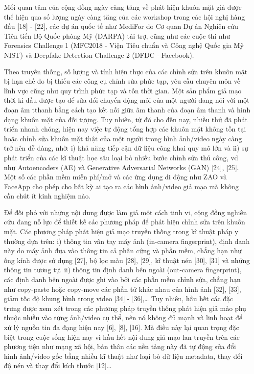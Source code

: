 \documentclass{article}
\begin{document}
Mối quan tâm của cộng đồng ngày càng tăng về phát hiện khuôn mặt giả được thể hiện qua số lượng ngày càng tăng của các workshop trong các hội nghị hàng đầu [18] - [22], các dự án quốc tế như MediFor do Cơ quan Dự án Nghiên cứu Tiên tiến Bộ Quốc phòng Mỹ (DARPA) tài trợ, cũng như các cuộc thi như Forensics Challenge 1 (MFC2018 - Viện Tiêu chuẩn và Công nghệ Quốc gia Mỹ NIST) và Deepfake Detection Challenge 2 (DFDC - Facebook).

Theo truyền thống, số lượng và tính hiện thực của các chỉnh sửa trên khuôn mặt bị hạn chế do bị thiếu các công cụ chỉnh sửa phức tạp, yêu cầu chuyên môn về lĩnh vực cũng như quy trình phức tạp và tốn thời gian. Một sản phẩm giả mạo thời kì đầu được tạo để sửa đổi chuyển động môi của một người đang nói với một đoạn âm tthanh bằng cách tạo kết nối giữa âm thanh của đoạn âm thanh và hình dạng khuôn mặt của đối tượng. Tuy nhiên, từ đó cho đến nay, nhiều thứ đã phát triển nhanh chóng, hiện nay việc tự động tổng hợp các khuôn mặt không tồn tại hoặc chỉnh sửa khuôn mặt thật của một người trong hình ảnh/video ngày càng trở nên dễ dàng, nhờ: i) khả năng tiếp cận dữ liệu công khai quy mô lớn và ii) sự phát triển của các kĩ thuật học sâu loại bỏ nhiều bước chỉnh sửa thủ công, vd như Autoencoders (AE) và Generative Adversarial Networks (GAN) [24], [25]. Một số các phần mềm miễn phí/mở và các ứng dụng di động như ZAO và FaceApp cho phép cho bất kỳ ai tạo ra các hình ảnh/video giả mạo mà không cần chút ít kinh nghiệm nào.

Để đối phó với những nội dung được làm giả một cách tinh vi, cộng đồng nghiên cứu đang nỗ lực để thiết kế các phương pháp để phát hiện chỉnh sửa trên khuôn mặt. Các phương pháp phát hiện giả mạo truyền thống trong kĩ thuật pháp y thường dựa trên: i) thông tin vân tay máy ảnh (in-camera fingerprint), định danh này do máy ảnh đưa vào thông tin cả phần cứng và phần mềm, chẳng hạn như ống kính được sử dụng [27], bộ lọc màu [28], [29], kĩ thuật nén [30], [31] và những thông tin tương tự. ii) thông tin định danh bên ngoài (out-camera fingerprint), các định danh bên ngoài được ghi vào bởi các phần mềm chỉnh sửa, chẳng hạn như copy-paste hoặc copy-move các phần tử khác nhau của hình ảnh [32], [33], giảm tốc độ khung hình trong video [34] - [36],… Tuy nhiên, hầu hết các đặc trưng được xem xét trong các phương pháp truyền thống phát hiện giả mảo phụ thuộc nhiều vào từng ảnh/video cụ thể, nên nó không đủ mạnh và linh hoạt để xử lý nguồn tin đa đạng hiện nay [6], [8], [16]. Mà điều này lại quan trọng đặc biệt trong cuộc sống hiện nay vì hầu hết nội dung giả mạo lan truyền trên các phương tiện như mạng xã hội, bản thân các nền tảng này đã tự động sửa đổi hình ảnh/video gốc bằng nhiều kĩ thuật như loại bỏ dữ liệu metadata, thay đổi độ nén và thay đổi kích thước [12]…
\end{document}
